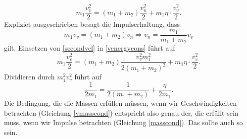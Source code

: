 \begin{Answer}[ref = ipho201741]
	\begin{equation}\label{venergycons}
		m_1 \frac{v_v^2}{2} = \left(m_1+m_2\right)\frac{v_n^2}{2} + m_1\eta  \cdot \frac{v_v^2}{2}.
	\end{equation}
	Expliziet ausgeschrieben besagt die Impulserhaltung, dass 
	\begin{equation}\label{secondvel}
		m_1 v_v = \left(m_1+m_2\right)v_n \Rightarrow v_n = \frac{m_1}{m_1+m_2}v_v
	\end{equation}
	gilt. Einsetzen von \eqref{secondvel} in \eqref{venergycons} führt auf
	\begin{equation*}
	m_1\frac{v_v^2}{2} = \left(m_1+m_2\right)\frac{v_v^2 m_1^2}{2\left(m_1+m_2\right)^2} + m_1\eta \cdot \frac{v_v^2}{2}.
	\end{equation*}
	Dividieren durch $m_1^2v_v^2$ führt auf 
	\begin{equation}\label{vmasscond}
		\frac{1}{2m_1} = \frac{1}{2\left(m_1+m_2\right)} + \frac{\eta}{2m_1}.
	\end{equation}
	Die Bedingung, die die Massen erfüllen müssen, wenn wir Geschwindigkeiten betrachten (Gleichung \eqref{vmasscond}) entspricht also genau der, die erfüllt sein muss, wenn wir Impulse betrachten (Gleichung \eqref{masscond}). Das sollte auch so sein.
\end{Answer}
